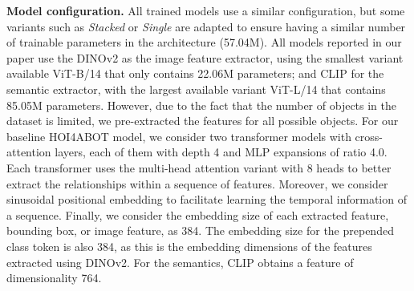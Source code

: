 \documentclass{article}
\begin{document}
\textbf{Model configuration.} All trained models use a similar configuration, but some variants such as \textit{Stacked} or \textit{Single} are adapted to ensure having a similar number of trainable parameters in the architecture (57.04M).  All models reported in our paper use the DINOv2 \citep{oquab2023dinov2} as the image feature extractor, using the smallest variant available ViT-B/14 that only contains 22.06M parameters; and CLIP \citep{clip} for the semantic extractor, with the largest available variant ViT-L/14 that contains 85.05M parameters. However, due to the fact that the number of objects in the dataset is limited, we pre-extracted the features for all possible objects.  For our baseline HOI4ABOT model, we consider two transformer models with cross-attention layers, each of them with depth 4 and MLP expansions of ratio 4.0. Each transformer uses the multi-head attention variant with 8 heads to better extract the relationships within a sequence of features. Moreover, we consider sinusoidal positional embedding to facilitate learning the temporal information of a sequence.  Finally, we consider the embedding size of each extracted feature, bounding box, or image feature, as 384. The embedding size for the prepended class token is also 384, as this is the embedding dimensions of the features extracted using DINOv2. For the semantics, CLIP obtains a feature of dimensionality 764.
\end{document}
